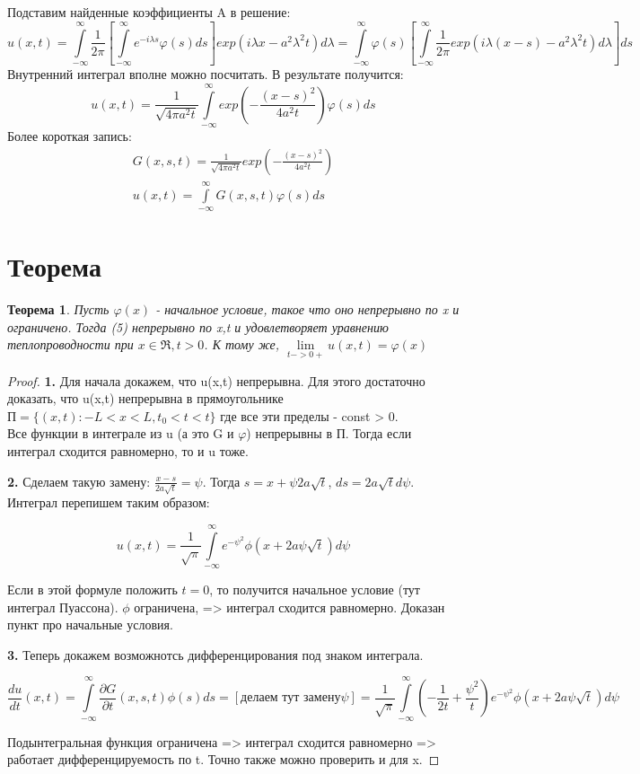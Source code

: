 \documentclass[11pt,a4paper, fqlen]{article}
\newtheorem*{thdef}{Теорема}
\begin{document}
	Подставим найденные коэффициенты A в решение:
	$$
		u(x,t) = \int \limits_{-\infty}^{\infty} \frac{1}{2\pi} \left[\int \limits_{-\infty}^{\infty} e^{-i \lambda s} \varphi(s) ds \right] exp(i \lambda x - a^2 \lambda^2 t) d\lambda = 
		\int \limits_{-\infty}^{\infty} \varphi(s) \left[\int \limits_{-\infty}^{\infty} \frac{1}{2\pi} exp(i \lambda (x-s) - a^2 \lambda^2 t) d\lambda \right] ds
	$$
	Внутренний интеграл вполне можно посчитать. В результате получится:
	$$
	u(x,t) = \frac{1}{\sqrt{4\pi a^2 t}} \int \limits_{-\infty}^{\infty} exp(-\frac{(x-s)^2}{4a^2t}) \varphi(s)ds
	$$
	Более короткая запись:
	\begin{gather}
		G(x,s,t) = \frac{1}{\sqrt{4\pi a^2 t}} exp(-\frac{(x-s)^2}{4a^2t}) \\	
		u(x,t) = \int \limits_{-\infty}^{\infty} G(x,s,t) \varphi(s) ds
	\end{gather}
	
\section{Теорема}
\begin{thdef}
	Пусть $\varphi(x)$ - начальное условие, такое что оно непрерывно по x и ограничено. Тогда (5) непрерывно по x,t и удовлетворяет уравнению теплопроводности при $x \in \Re, t>0$. К тому же, $\lim\limits_{t->0+} u(x,t) = \varphi(x)$
\end{thdef}

\begin{proof}
	\textbf{1.} Для начала докажем, что u(x,t) непрерывна. Для этого достаточно доказать, что u(x,t) непрерывна в прямоугольнике $П = \{(x,t): -L < x < L, t_0 < t < t\}$ где все эти пределы - const > 0. \\
	Все функции в интеграле из u (а это G и $\varphi$) непрерывны в П. Тогда если интеграл сходится равномерно, то и u тоже.
	
	\textbf{2.} Сделаем такую замену: $\frac{x-s}{2a\sqrt{t}} = \psi$. Тогда $s = x + \psi 2 a \sqrt{t}$, $ds = 2a\sqrt{t}d\psi$. Интеграл перепишем таким образом:
	
	$$
	u(x,t) = \frac{1}{\sqrt{\pi}} \int \limits_{-\infty}^{\infty} e^{-\psi^2} \phi(x+2a\psi \sqrt{t}) d\psi
	$$
	
	Если в этой формуле положить $t = 0$, то получится начальное условие (тут интеграл Пуассона). $\phi$ ограничена, => интеграл сходится равномерно. Доказан пункт про начальные условия.
	
	\textbf{3.} Теперь докажем возможнотсь дифференцирования под знаком интеграла.
	
	$$
	\frac{du}{dt} (x,t) = \int \limits_{-\infty}^{\infty} \frac{\partial G}{\partial t}(x,s,t) \phi(s) ds = [\text{делаем тут замену} \psi] = \frac{1}{\sqrt{\pi}} \int \limits_{-\infty}^{\infty} (-\frac{1}{2t} + \frac{\psi^2}{t})e^{-\psi^2} \phi(x+2a\psi \sqrt{t}) d\psi
	$$
	
	Подынтегральная функция ограничена => интеграл сходится равномерно => работает дифференцируемость по t. Точно также можно проверить и для x.
\end{proof}
\end{document}
